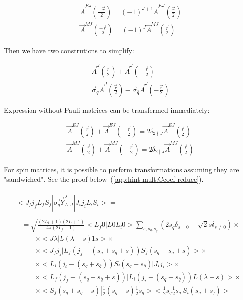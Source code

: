 \begin{align}
    &\vec{A}^{EJ}(\frac{-\vec{r}}{2}) = (-1)^{J+1} \vec{A}^{EJ}(\frac{\vec{r}}{2}) \\
    &\vec{A}^{MJ}(\frac{-\vec{r}}{2}) = (-1)^{J} \vec{A}^{MJ}(\frac{\vec{r}}{2})
\end{align}

Then we have two construtions to simplify:

\begin{align}
    &\vec{A}^{J}(\frac{\vec{r}}{2}) + \vec{A}^{J}(-\frac{\vec{r}}{2}) \\
    &\vec{\sigma}_{q} \vec{A}^{J}(\frac{\vec{r}}{2}) - \vec{\sigma}_{\overline{q}} \vec{A}^{J}(-\frac{\vec{r}}{2}) \label{eq:sigmaAJ}
\end{align}

Expression without Pauli matrices can be transformed immediately:

\begin{align}
    &\vec{A}^{EJ}(\frac{\vec{r}}{2}) + \vec{A}^{EJ}(-\frac{\vec{r}}{2}) = 2 \delta_{2 \nmid J} \vec{A}^{EJ}(\frac{\vec{r}}{2}) \\
    &\vec{A}^{MJ}(\frac{\vec{r}}{2}) + \vec{A}^{MJ}(-\frac{\vec{r}}{2}) = 2 \delta_{2 \mid J} \vec{A}^{MJ}(\frac{\vec{r}}{2})
\end{align}

For spin matrices, it is possible to perform transformations assuming they are "sandwiched". See the proof below~(\cref{app:hint-mult:Ccoef-reduce}).

\begin{align}
    \begin{split}
        <J_f j_f L_f S_f| \vec{\sigma_q} \vec{Y}_{L, J}^\lambda |J_i j_i L_i S_i> =
    \end{split} \\
    \begin{split}
        &= \sqrt{\frac{(2L_i + 1)(2L+1)}{4 \pi (2L_f + 1)}} < L_f 0 | L 0 L_i 0 > \sum_{s, s_{q}, s_{\overline{q}}} (2 s_q \delta_{s = 0} - \sqrt{2} s \delta_{s \neq 0}) \times \\
    &\qquad\times <J \lambda| L (\lambda - s) 1 s> \times\\
    &\qquad\times <J_f j_f| L_f (j_f-(s_q + s_{\overline{q}} + s)) S_f (s_q + s_{\overline{q}} + s)> \times \\
        &\qquad\times <L_i (j_i - (s_q + s_{\overline{q}})) S_i (s_q + s_{\overline{q}})| J_i j_i> \times \\
        &\qquad\times <L_f (j_f - (s_q + s_{\overline{q}} + s))| L_i (j_i - (s_q + s_{\overline{q}})) L (\lambda - s)>  \times\\
        &\qquad\times <S_f (s_q + s_{\overline{q}} + s)| \frac{1}{2} (s_{q}+s) \frac{1}{2} s_{\overline{q}}> <\frac{1}{2} s_{q} \frac{1}{2} s_{\overline{q}} |S_i (s_q + s_{\overline{q}})>
    \end{split}
\end{align}


